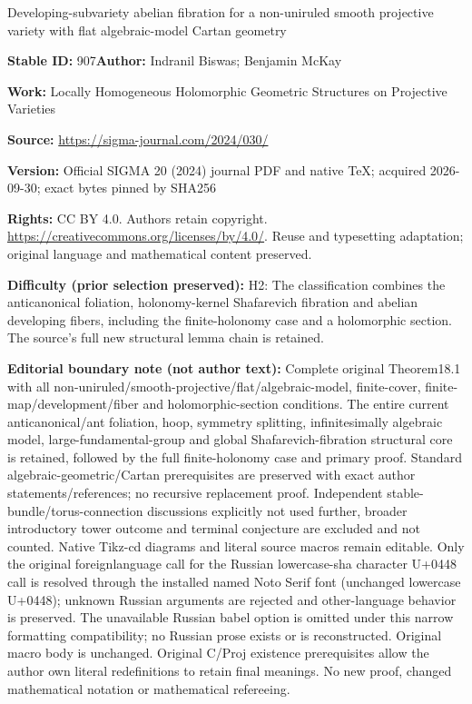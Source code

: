 \documentclass[11pt]{article}
\numberwithin{equation}{section}
\numberwithin{equation}{section}
\begin{document}
\begin{center}\Large Developing-subvariety abelian fibration for a non-uniruled smooth projective variety with flat algebraic-model Cartan geometry\end{center}
\noindent\textbf{Stable ID:} 907\quad\textbf{Author:} Indranil Biswas; Benjamin McKay\par
\noindent\textbf{Work:} Locally Homogeneous Holomorphic Geometric Structures on Projective Varieties\par
\noindent\textbf{Source:} \url{https://sigma-journal.com/2024/030/}\par
\noindent\textbf{Version:} Official SIGMA 20 (2024) journal PDF and native TeX; acquired 2026-09-30; exact bytes pinned by SHA256\par
\noindent\textbf{Rights:} CC BY 4.0. Authors retain copyright. \url{https://creativecommons.org/licenses/by/4.0/}. Reuse and typesetting adaptation; original language and mathematical content preserved.\par
\noindent\textbf{Difficulty (prior selection preserved):} {\CJKfont H2: The classification combines the anticanonical foliation, holonomy-kernel Shafarevich fibration and abelian developing fibers, including the finite-holonomy case and a holomorphic section. The source’s full new structural lemma chain is retained.}\par
\medskip\noindent\textbf{Editorial boundary note (not author text):} Complete original Theorem18.1 with all non-uniruled/smooth-projective/flat/algebraic-model, finite-cover, finite-map/development/fiber and holomorphic-section conditions. The entire current anticanonical/ant foliation, hoop, symmetry splitting, infinitesimally algebraic model, large-fundamental-group and global Shafarevich-fibration structural core is retained, followed by the full finite-holonomy case and primary proof. Standard algebraic-geometric/Cartan prerequisites are preserved with exact author statements/references; no recursive replacement proof. Independent stable-bundle/torus-connection discussions explicitly not used further, broader introductory tower outcome and terminal conjecture are excluded and not counted. Native Tikz-cd diagrams and literal source macros remain editable. Only the original foreignlanguage call for the Russian lowercase-sha character U+0448 call is resolved through the installed named Noto Serif font (unchanged lowercase U+0448); unknown Russian arguments are rejected and other-language behavior is preserved. The unavailable Russian babel option is omitted under this narrow formatting compatibility; no Russian prose exists or is reconstructed. Original macro body is unchanged. Original C/Proj existence prerequisites allow the author own literal redefinitions to retain final meanings. No new proof, changed mathematical notation or mathematical refereeing.\par
\end{document}
